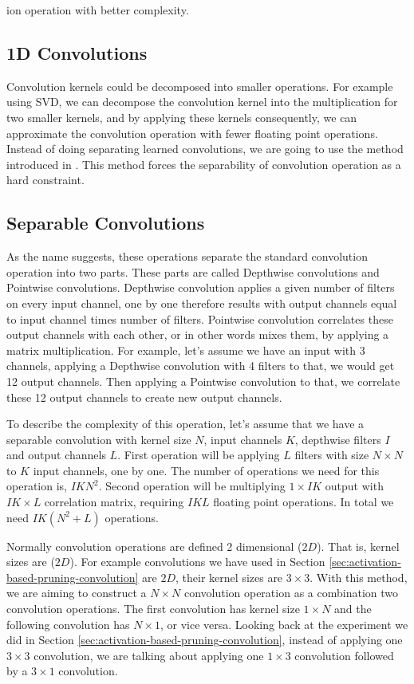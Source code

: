 ion operation with better complexity.

\subsection{1D Convolutions}
Convolution kernels could be decomposed into smaller operations. For example using SVD, we can decompose the convolution kernel into the multiplication for two smaller kernels, and by applying these kernels consequently, we can approximate the convolution operation with fewer floating point operations. Instead of doing separating learned convolutions, we are going to use the method introduced in \cite{alvarez2016decomposeme}. This method forces the separability of convolution operation as a hard constraint. 

\subsection{Separable Convolutions}
As the name suggests, these operations separate the standard convolution operation into two parts. These parts are called Depthwise convolutions and Pointwise convolutions. Depthwise convolution applies a given number of filters on every input channel, one by one therefore results with output channels equal to input channel times number of filters. Pointwise convolution correlates these output channels with each other, or in other words mixes them, by applying a matrix multiplication. For example, let's assume we have an input with 3 channels, applying a Depthwise convolution with 4 filters to that, we would get 12 output channels. Then applying a Pointwise convolution to that, we correlate these 12 output channels to create new output channels. 

To describe the complexity of this operation, let's assume that we have a separable convolution with kernel size $N$, input channels $K$, depthwise filters $I$ and output channels $L$. First operation will be applying $L$ filters with size $N \times N$ to $K$ input channels, one by one. The number of operations we need for this operation is, $IKN^2$. Second operation will be multiplying $1 \times IK$ output with $IK \times L$ correlation matrix, requiring $IKL$ floating point operations. In total we need $IK(N^2+L)$ operations. 


Normally convolution operations are defined 2 dimensional ($2D$). That is, kernel sizes are ($2D$). For example convolutions we have used in Section \ref{sec:activation-based-pruning-convolution} are $2D$, their kernel sizes are $3 \times 3$. With this method, we are aiming to construct a $N \times N$ convolution operation as a combination two convolution operations. The first convolution has kernel size $1 \times N$ and the following convolution has $N \times 1$, or vice versa. Looking back at the experiment we did in  Section \ref{sec:activation-based-pruning-convolution}, instead of applying one $3 \times 3$ convolution, we are talking about applying one $1 \times 3$ convolution followed by a $3 \times 1$ convolution. 

